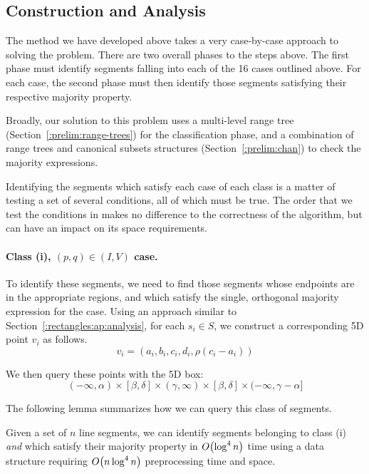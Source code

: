 \subsection{Construction and Analysis}
\label{:rectangles:ao:analysis}

The method we have developed above takes a very case-by-case approach to solving the problem. There are two overall phases to the steps above. The first phase must identify segments falling into each of the 16 cases outlined above. For each case, the second phase must then identify those segments satisfying their respective majority property. 

Broadly, our solution to this problem uses a multi-level range tree (Section~\ref{:prelim:range-trees}) for the classification phase, and a combination of range trees and canonical subsets structures (Section~\ref{:prelim:chan}) to check the majority expressions. 

Identifying the segments which satisfy each case of each class is a matter of testing a set of several conditions, all of which must be true. The order that we test the conditions in makes no difference to the correctness of the algorithm, but can have an impact on its space requirements.

\paragraph{Class (i), $(p, q) \in (I, V)$ case.} 
To identify these segments, we need to find those segments whose endpoints are in the appropriate regions, and which satisfy the single, orthogonal majority expression for the case. 
Using an approach similar to Section~\ref{:rectangles:ap:analysis}, for each $s_i \in S$, we construct a corresponding 5D point $v_i$ as follows.
\[
v_i = (a_i, b_i, c_i, d_i, \rho(c_i - a_i))
\]

\noindent We then query these points with the 5D box:
\[
(-\infty, \alpha) \times [\beta, \delta] \times (\gamma, \infty) \times [\beta, \delta] \times (-\infty, \gamma - \alpha]
\]

\noindent The following lemma summarizes how we can query this class of segments.

\begin{lemma}
\label{lem:ao:class1:v}
Given a set of $n$ line segments, we can identify segments belonging to class (i) \emph{and} which satisfy their majority property in $O\!\left(\log^4{n}\right)$ time using a data structure requiring $O\!\left(n\log^4{n}\right)$ preprocessing time and space.
\end{lemma}

